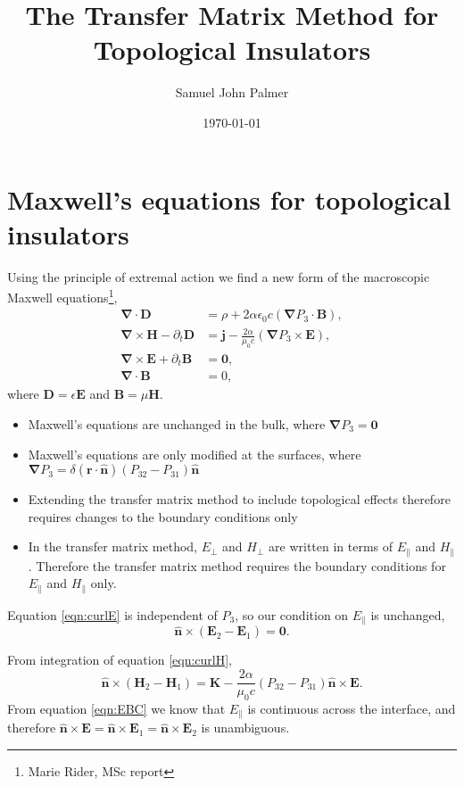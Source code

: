 \documentclass[notitlepage,nofootinbib]{revtex4-1}
\renewcommand{\vec}[1]{\mathbf{#1}}
\newcommand{\grad}{\boldsymbol{\nabla}}
\newcommand{\divg}{\boldsymbol{\nabla}\cdot}
\newcommand{\curl}{\boldsymbol{\nabla}\times}
\begin{document}
\title{The Transfer Matrix Method for Topological Insulators}
\author{Samuel John Palmer}
\date{\today}
\maketitle

\section{Maxwell's equations for topological insulators}
Using the principle of extremal action we find a new form of the macroscopic Maxwell equations\footnote{Marie Rider, MSc report},
\begin{subequations}\begin{alignat}{2}
	\label{eqn:divgD}
	\divg \vec{D}
	&=
	\rho + 2 \alpha \epsilon_0 c \left(\grad P_3 \cdot \vec{B}\right),
	\\
	\label{eqn:curlH}
	\curl \vec{H} - \partial_t \vec{D}
	&=
	\vec{j} - \frac{2\alpha}{\mu_0c}\left(\grad P_3 \times \vec{E} \right),
	\\
	\label{eqn:curlE}
	\curl \vec{E} + \partial_t \vec{B}
	&=
	\vec{0},
	\\
	\label{eqn:divgB}
	\divg \vec{B}
	&=
	0,
\end{alignat}\end{subequations}
where $ \vec{D} = \epsilon \vec{E} $ and $ \vec{B} = \mu \vec{H} $.

\begin{itemize}
	\item Maxwell's equations are unchanged in the bulk, where $ \grad P_3 = \vec{0} $
	\item Maxwell's equations are only modified at the surfaces, where $ \grad P_3 = \delta(\vec{r}\cdot\vec{\hat{n}}) (P_{32} - P_{31}) \vec{\hat{n}} $
	\item Extending the transfer matrix method to include topological effects therefore requires changes to the boundary conditions only
	\item In the transfer matrix method, $ E_\perp $ and $ H_\perp $ are written in terms of $ E_\parallel $ and $ H_\parallel $. Therefore the transfer matrix method requires the boundary conditions for $ E_\parallel $ and $ H_\parallel $ only.
\end{itemize}

Equation \eqref{eqn:curlE} is independent of $ P_3 $, so our condition on $ E_\parallel $ is unchanged,
\begin{equation}
	\label{eqn:EBC}
	\vec{\hat{n}} \times (\vec{E}_2 - \vec{E}_1) = \vec{0}.
\end{equation}

From integration of equation \eqref{eqn:curlH},
\begin{equation}
	\label{eqn:HBC}
	\vec{\hat{n}} \times (\vec{H}_2 - \vec{H}_1) = \vec{K} - \frac{2\alpha}{\mu_0c}(P_{32}-P_{31}) \vec{\hat{n}} \times \vec{E}.
\end{equation}
From equation \eqref{eqn:EBC} we know that $ E_\parallel $ is continuous across the interface, and therefore $ \vec{\hat{n}} \times \vec{E} = \vec{\hat{n}} \times \vec{E}_1 = \vec{\hat{n}} \times \vec{E}_2 $ is unambiguous.
\end{document}
